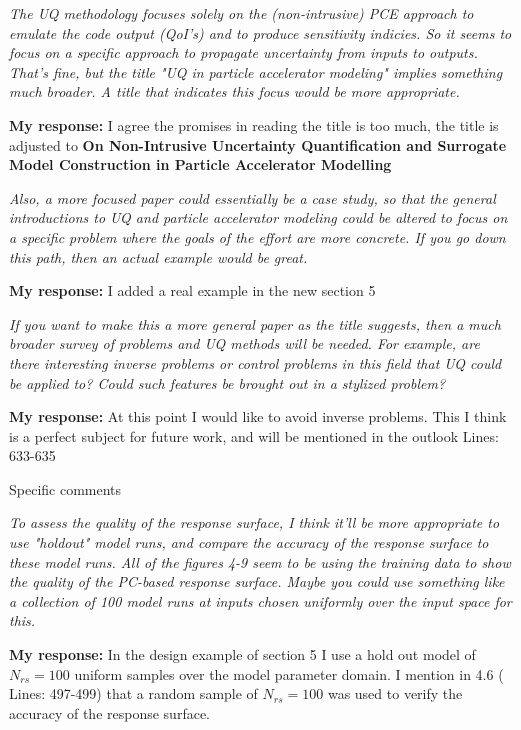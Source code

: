 \documentclass{article}
\newcommand{\atline}[1]{\color{red} Lines: #1\color{blue}}
\begin{document}
{\it 
The UQ methodology focuses solely on the (non-intrusive) PCE approach 
to emulate the code output (QoI's) and to produce sensitivity indicies. 
So it seems to focus on a specific approach to propagate uncertainty from 
inputs to outputs. That's fine, but the title "UQ in particle accelerator 
modeling" implies something much broader. A title that indicates this focus 
would be more appropriate. }

{\bf My response: }{\color{blue} I agree the promises in reading the title is too much, the title is adjusted to {\bf On Non-Intrusive Uncertainty Quantification and Surrogate Model Construction in Particle Accelerator Modelling}}


{\it 
Also, a more focused paper could essentially 
be a case study, so that the general introductions to UQ and particle 
accelerator modeling could be altered to focus on a specific problem 
where the goals of the effort are more concrete. If you go down this 
path, then an actual example would be great. 
}

{\bf My response: }{\color{blue} I added a real example in the new section 5} 

{\it 
If you want to make this a more general paper as the title suggests, 
then a much broader survey of problems and UQ methods will be needed. 
For example, are there interesting inverse problems or control 
problems in this field that UQ could be applied to? Could such features 
be brought out in a stylized problem? 
}

{\bf My response: }{\color{blue} At this point I would like to avoid inverse problems. This I think is 
a perfect subject for future work, and will be mentioned in the outlook  \atline{633-635}} 

Specific comments 

{\it 
To assess the quality of the response surface, I think it'll be more 
appropriate to use "holdout" model runs, and compare the accuracy of the 
response surface to these model runs. All of the figures 4-9 seem to 
be using the training data to show the quality of the PC-based response 
surface. Maybe you could use something like a collection of 100 model 
runs at inputs chosen uniformly over the input space for this. 
}

{\bf My response: }{\color{blue} In the design example of section 5 I use a hold out model of $N_{rs} = 100$ uniform samples over the model parameter domain. I mention in 4.6 (\atline{497-499}) that a random sample of  $N_{rs} = 100$ was used to verify the accuracy of the response surface.} 
\end{document}
